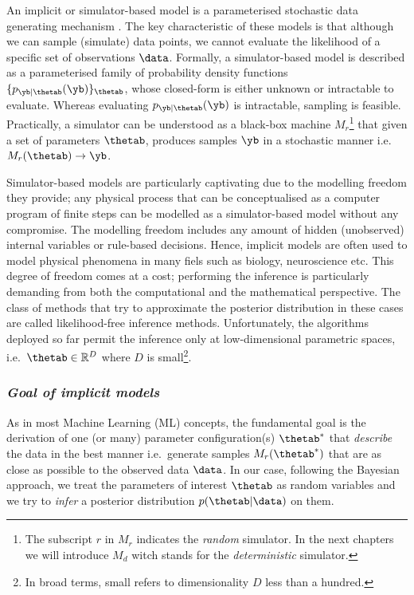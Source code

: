 An implicit or simulator-based model is a parameterised stochastic
data generating mechanism \cite{Gutmann2016}. The key characteristic
of these models is that although we can sample (simulate) data points,
we cannot evaluate the likelihood of a specific set of observations
$\data$. Formally, a simulator-based model is described as a
parameterised family of probability density functions
$\{ p_{\yb|\thetab}(\yb) \}_{\thetab}$, whose closed-form is either
unknown or intractable to evaluate. Whereas evaluating
$p_{\yb|\thetab}(\yb)$ is intractable, sampling is
feasible. Practically, a simulator can be understood as a black-box
machine $M_r$\footnote{The subscript $r$ in $M_r$ indicates the
  \textit{random} simulator. In the next chapters we will introduce
  $M_d$ witch stands for the \textit{deterministic} simulator.} that
given a set of parameters $\thetab$, produces samples $\yb$ in a
stochastic manner i.e.\ $M_r(\thetab) \rightarrow \yb$.

Simulator-based models are particularly captivating due to the
modelling freedom they provide; any physical process that can be
conceptualised as a computer program of finite steps can be modelled
as a simulator-based model without any compromise. The modelling
freedom includes any amount of hidden (unobserved) internal variables
or rule-based decisions. Hence, implicit models are often used to
model physical phenomena in many fiels such as biology, neuroscience
etc. This degree of freedom comes at a cost; performing the inference
is particularly demanding from both the computational and the
mathematical perspective. The class of methods that try to approximate
the posterior distribution in these cases are called likelihood-free
inference methods. Unfortunately, the algorithms deployed so far
permit the inference only at low-dimensional parametric spaces, i.e.\
$\thetab \in \mathbb{R}^D$ where $D$ is small\footnote{In broad terms,
  small refers to dimensionality $D$ less than a hundred.}.

\subsubsection*{\textit{Goal of implicit models}}

As in most Machine Learning (ML) concepts, the fundamental goal is the
derivation of one (or many) parameter configuration(s) $\thetab^*$
that \textit{describe} the data in the best manner i.e.\ generate
samples $M_r(\thetab^*)$ that are as close as possible to the observed
data $\data$. In our case, following the Bayesian approach, we treat
the parameters of interest $\thetab$ as random variables and we try to
\textit{infer} a posterior distribution $p(\thetab|\data)$ on them.

